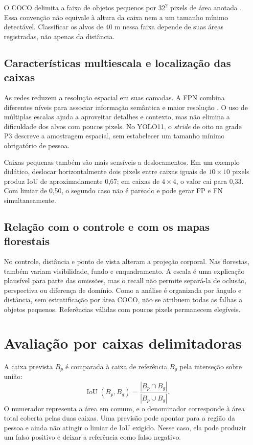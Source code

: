 O COCO delimita a faixa de objetos pequenos por $32^2$ pixels de área anotada \cite{coco_eval}. Essa convenção não equivale à altura da caixa nem a um tamanho mínimo detectável. Classificar os alvos de 40 m nessa faixa depende de suas áreas registradas, não apenas da distância.

\subsection{Características multiescala e localização das caixas}
As redes reduzem a resolução espacial em suas camadas. A FPN combina diferentes níveis para associar informação semântica e maior resolução \cite{lin2017fpn}. O uso de múltiplas escalas ajuda a aproveitar detalhes e contexto, mas não elimina a dificuldade dos alvos com poucos pixels. No YOLO11, o \textit{stride} de oito na grade P3 descreve a amostragem espacial, sem estabelecer um tamanho mínimo obrigatório de pessoa.

Caixas pequenas também são mais sensíveis a deslocamentos. Em um exemplo didático, deslocar horizontalmente dois pixels entre caixas iguais de $10\times10$ pixels produz IoU de aproximadamente 0,67; em caixas de $4\times4$, o valor cai para 0,33. Com limiar de 0,50, o segundo caso não é pareado e pode gerar FP e FN simultaneamente.

\subsection{Relação com o controle e com os mapas florestais}
No controle, distância e ponto de vista alteram a projeção corporal. Nas florestas, também variam visibilidade, fundo e enquadramento. A escala é uma explicação plausível para parte das omissões, mas o recall não permite separá-la de oclusão, perspectiva ou diferença de domínio. Como a análise é organizada por ângulo e distância, sem estratificação por área COCO, não se atribuem todas as falhas a objetos pequenos. Referências válidas com poucos pixels permanecem elegíveis.

\section{Avaliação por caixas delimitadoras}
A caixa prevista $B_p$ é comparada à caixa de referência $B_g$ pela interseção sobre união:
\begin{equation}
\operatorname{IoU}(B_p,B_g)=\frac{|B_p\cap B_g|}{|B_p\cup B_g|}.
\end{equation}
O numerador representa a área em comum, e o denominador corresponde à área total coberta pelas duas caixas. Uma previsão pode apontar para a região da pessoa e ainda não atingir o limiar de IoU exigido. Nesse caso, ela pode produzir um falso positivo e deixar a referência como falso negativo.

